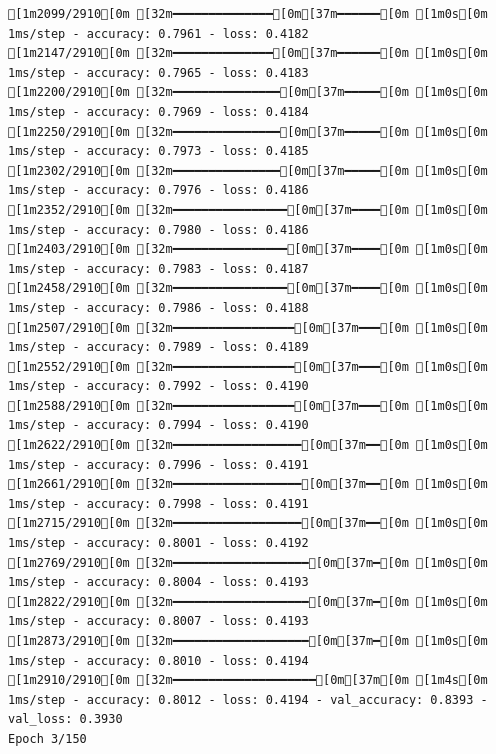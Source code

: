 \documentclass[
  letterpaper,
  DIV=11,
  numbers=noendperiod]{scrartcl}
\begin{document}
\begin{verbatim}
[1m2099/2910[0m [32m━━━━━━━━━━━━━━[0m[37m━━━━━━[0m [1m0s[0m 1ms/step - accuracy: 0.7961 - loss: 0.4182
[1m2147/2910[0m [32m━━━━━━━━━━━━━━[0m[37m━━━━━━[0m [1m0s[0m 1ms/step - accuracy: 0.7965 - loss: 0.4183
[1m2200/2910[0m [32m━━━━━━━━━━━━━━━[0m[37m━━━━━[0m [1m0s[0m 1ms/step - accuracy: 0.7969 - loss: 0.4184
[1m2250/2910[0m [32m━━━━━━━━━━━━━━━[0m[37m━━━━━[0m [1m0s[0m 1ms/step - accuracy: 0.7973 - loss: 0.4185
[1m2302/2910[0m [32m━━━━━━━━━━━━━━━[0m[37m━━━━━[0m [1m0s[0m 1ms/step - accuracy: 0.7976 - loss: 0.4186
[1m2352/2910[0m [32m━━━━━━━━━━━━━━━━[0m[37m━━━━[0m [1m0s[0m 1ms/step - accuracy: 0.7980 - loss: 0.4186
[1m2403/2910[0m [32m━━━━━━━━━━━━━━━━[0m[37m━━━━[0m [1m0s[0m 1ms/step - accuracy: 0.7983 - loss: 0.4187
[1m2458/2910[0m [32m━━━━━━━━━━━━━━━━[0m[37m━━━━[0m [1m0s[0m 1ms/step - accuracy: 0.7986 - loss: 0.4188
[1m2507/2910[0m [32m━━━━━━━━━━━━━━━━━[0m[37m━━━[0m [1m0s[0m 1ms/step - accuracy: 0.7989 - loss: 0.4189
[1m2552/2910[0m [32m━━━━━━━━━━━━━━━━━[0m[37m━━━[0m [1m0s[0m 1ms/step - accuracy: 0.7992 - loss: 0.4190
[1m2588/2910[0m [32m━━━━━━━━━━━━━━━━━[0m[37m━━━[0m [1m0s[0m 1ms/step - accuracy: 0.7994 - loss: 0.4190
[1m2622/2910[0m [32m━━━━━━━━━━━━━━━━━━[0m[37m━━[0m [1m0s[0m 1ms/step - accuracy: 0.7996 - loss: 0.4191
[1m2661/2910[0m [32m━━━━━━━━━━━━━━━━━━[0m[37m━━[0m [1m0s[0m 1ms/step - accuracy: 0.7998 - loss: 0.4191
[1m2715/2910[0m [32m━━━━━━━━━━━━━━━━━━[0m[37m━━[0m [1m0s[0m 1ms/step - accuracy: 0.8001 - loss: 0.4192
[1m2769/2910[0m [32m━━━━━━━━━━━━━━━━━━━[0m[37m━[0m [1m0s[0m 1ms/step - accuracy: 0.8004 - loss: 0.4193
[1m2822/2910[0m [32m━━━━━━━━━━━━━━━━━━━[0m[37m━[0m [1m0s[0m 1ms/step - accuracy: 0.8007 - loss: 0.4193
[1m2873/2910[0m [32m━━━━━━━━━━━━━━━━━━━[0m[37m━[0m [1m0s[0m 1ms/step - accuracy: 0.8010 - loss: 0.4194
[1m2910/2910[0m [32m━━━━━━━━━━━━━━━━━━━━[0m[37m[0m [1m4s[0m 1ms/step - accuracy: 0.8012 - loss: 0.4194 - val_accuracy: 0.8393 - val_loss: 0.3930
Epoch 3/150


\end{verbatim}
\end{document}
